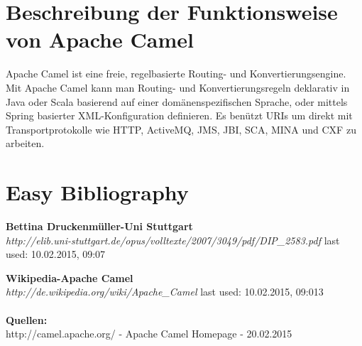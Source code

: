 \documentclass[12pt]{article}
\begin{document}
\section{Beschreibung der Funktionsweise von Apache Camel}

Apache Camel ist eine freie, regelbasierte Routing- und Konvertierungsengine. Mit Apache Camel kann man Routing- und Konvertierungsregeln deklarativ in Java oder Scala basierend auf einer domänenspezifischen Sprache, oder mittels Spring basierter XML-Konfiguration definieren.\cite{CamelWiki} Es benützt URIs um direkt mit Transportprotokolle wie  HTTP, ActiveMQ, JMS, JBI, SCA, MINA und CXF zu arbeiten.

\section{Easy Bibliography}

\listoftables
\listoffigures
\printglossaries

\begin{thebibliography}{56}

   \textbf{Bettina Druckenmüller-Uni Stuttgart}\\
  \textit{http://elib.uni-stuttgart.de/opus/volltexte/2007/3049/pdf/DIP\_2583.pdf}
  \newline last used: 10.02.2015, 09:07

   \textbf{Wikipedia-Apache Camel}\\
  \textit{http://de.wikipedia.org/wiki/Apache\_Camel}
  \newline last used: 10.02.2015, 09:013
 \\\\
 \textbf{Quellen:}\\
 http://camel.apache.org/ - Apache Camel Homepage - 20.02.2015 \\
 
 
 
\end{thebibliography}
\end{document}
